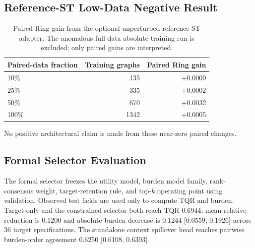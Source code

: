 \subsection{Reference-ST Low-Data Negative Result}
\label{app:reference_st_lowdata}
\begin{table}[h]
\centering\scriptsize
\caption{Paired Ring gain from the optional unperturbed reference-ST adapter. The anomalous full-data absolute training run is excluded; only paired gains are interpreted.}
\label{tab:app_reference_st_lowdata}
\begin{tabular}{lrr}
\toprule
Paired-data fraction & Training graphs & Paired Ring gain \\
\midrule
10\% & 135 & +0.0009 \\
25\% & 335 & +0.0002 \\
50\% & 670 & +0.0032 \\
100\% & 1342 & +0.0005 \\
\bottomrule
\end{tabular}
\end{table}
No positive architectural claim is made from these near-zero paired changes.

\subsection{Formal Selector Evaluation}
\label{app:formal_selector}
The formal selector freezes the utility model, burden model family, rank-consensus weight, target-retention rule, and top-$k$ operating point using validation. Observed test fields are used only to compute TQR and burden. Target-only and the constrained selector both reach TQR 0.6944; mean relative reduction is 0.1200 and absolute burden decrease is 0.1244 [0.0559, 0.1926] across 36 target specifications. The standalone \methodname{} context spillover head reaches pairwise burden-order agreement 0.6250 [0.6108, 0.6393].
